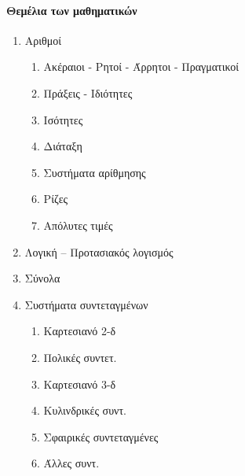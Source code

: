 \documentclass[twoside,nofonts,internet,shmeiwseis]{thewria}
\begin{document}
\twocolumn
\paragraph{Θεμέλια των μαθηματικών}
\begin{enumerate}
\item Αριθμοί
\begin{enumerate}
\item Ακέραιοι - Ρητοί - Άρρητοι - Πραγματικοί
\item Πράξεις - Ιδιότητες
\item Ισότητες
\item Διάταξη
\item Συστήματα αρίθμησης
\item Ρίζες
\item Απόλυτες τιμές
\end{enumerate}
\item Λογική – Προτασιακός λογισμός
\item Σύνολα
\item Συστήματα συντεταγμένων
\begin{enumerate}
\item Καρτεσιανό 2-δ
\item Πολικές συντετ.
\item Καρτεσιανό 3-δ
\item Κυλινδρικές συντ.
\item Σφαιρικές συντεταγμένες
\item Άλλες συντ.
\end{enumerate}
\end{enumerate}
\end{document}
